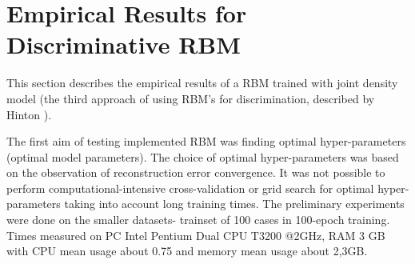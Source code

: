 \documentclass[a4paper]{scrartcl}
\begin{document}
 
 
\section{Empirical Results for Discriminative RBM}
This section describes the empirical results of a RBM trained with joint density model (the third approach of using RBM's for discrimination, described by Hinton \cite{Hinton}).
\par The first aim of testing implemented RBM was finding optimal hyper-parameters (optimal model parameters). The choice of optimal hyper-parameters was based on the observation of reconstruction error convergence. It was not possible to perform computational-intensive cross-validation or grid search for optimal hyper-parameters taking into account long training times. The preliminary experiments were done on the smaller datasets- trainset of 100 cases in 100-epoch training. Times measured on PC Intel Pentium Dual CPU T3200 @2GHz, RAM 3 GB with CPU mean usage about 0.75 and memory mean usage about 2,3GB.
\end{document}
